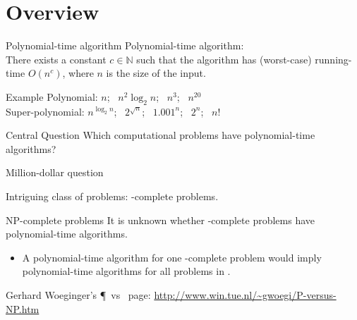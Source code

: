 



\section{Overview}

\begin{frame}
	\begin{block}{Polynomial-time algorithm}
		Polynomial-time algorithm:\\
		There exists a constant $c\in \mathbb{N}$ such that the algorithm has (worst-case) running-time $O(n^c)$, where $n$ is the size of the input.
	\end{block}

	\pause
	\begin{block}{Example}
		Polynomial: $n$; ~$n^2 \log_2 n$; ~$n^3$; ~$n^{20}$\\
		Super-polynomial: $n^{\log_2 n}$; ~$2^{\sqrt{n}}$; ~$1.001^n$; ~$2^n$; ~$n!$
	\end{block}

\end{frame}


\begin{frame}

	\begin{block}{Central Question}
		Which computational problems have polynomial-time algorithms?
	\end{block}

\end{frame}

\begin{frame}{Million-dollar question}

	Intriguing class of problems: \NP-complete problems.

	\begin{block}{NP-complete problems}
		It is unknown whether \NP-complete problems have polynomial-time algorithms.
		\begin{itemize}
			\item A polynomial-time algorithm for one \NP-complete problem would imply polynomial-time algorithms for all problems in \NP.
		\end{itemize}
	\end{block}

	Gerhard Woeginger's \P\ vs \NP\ page: \url{http://www.win.tue.nl/~gwoegi/P-versus-NP.htm}

\end{frame}


